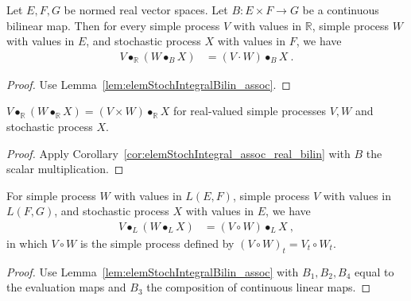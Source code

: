 \begin{corollary}\label{cor:elemStochIntegral_assoc_real_bilin}
Let $E, F, G$ be normed real vector spaces.
Let $B : E \times F \to G$ be a continuous bilinear map.
Then for every simple process $V$ with values in $\mathbb{R}$, simple process $W$ with values in $E$, and stochastic process $X$ with values in $F$, we have
\begin{align*}
  V \bullet_{\mathbb{R}} (W \bullet_{B} X)
  &= (V \cdot W) \bullet_{B} X
  \: .
\end{align*}
\end{corollary}

\begin{proof}
Use Lemma~\ref{lem:elemStochIntegralBilin_assoc}.
\end{proof}


\begin{lemma}\label{lem:elemStochIntegral_assoc}
$V \bullet_{\mathbb{R}} (W \bullet_{\mathbb{R}} X) = (V \times W) \bullet_{\mathbb{R}} X$ for real-valued simple processes $V, W$ and stochastic process $X$.
\end{lemma}

\begin{proof}
Apply Corollary~\ref{cor:elemStochIntegral_assoc_real_bilin} with $B$ the scalar multiplication.
\end{proof}


\begin{lemma}\label{lem:elemStochIntegralLinear_assoc}
  \leanok
For simple process $W$ with values in $L(E, F)$, simple process $V$ with values in $L(F, G)$, and stochastic process $X$ with values in $E$, we have
\begin{align*}
  V \bullet_L (W \bullet_L X)
  &= (V \circ W) \bullet_L X
  \: ,
\end{align*}
in which $V \circ W$ is the simple process defined by $(V \circ W)_t = V_t \circ W_t$.
\end{lemma}

\begin{proof}
  \leanok
Use Lemma~\ref{lem:elemStochIntegralBilin_assoc} with $B_1, B_2, B_4$ equal to the evaluation maps and $B_3$ the composition of continuous linear maps.
\end{proof}


